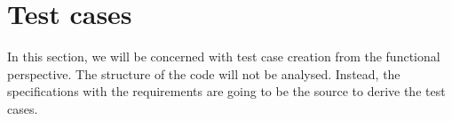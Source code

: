 \section{Test cases}
\label{sec-testcases}

In this section, we will be concerned with test case creation from the functional perspective. The structure of the code will not be analysed. Instead, the specifications with the requirements are going to be the source to derive the test cases.




%
